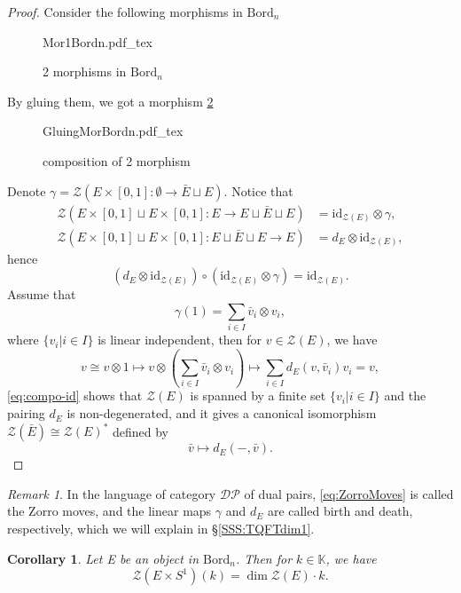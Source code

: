 \documentclass[10pt,reqno,final]{article}
\newcommand{\incfig}[1]{%
    \def\svgscale{0.38}
    {#1.pdf_tex}
}
\numberwithin{equation}{section}
\numberwithin{figure}{section}
\numberwithin{table}{section}
\theoremstyle{plain}
\newtheorem{corollary}{Corollary}[theorem]
\theoremstyle{definition}
\theoremstyle{remark}
\newtheorem{remark}{Remark}[theorem]
\begin{document}
\begin{proof}
      Consider the following morphisms in \(\mathrm{Bord}_{n}\)
    \begin{figure}[H]
      \centering
      \incfig{Mor1Bordn}
      \caption{2 morphisms in \(\mathrm{Bord}_{n}\)}
      \label{fig:Mor1Bordn}
    \end{figure}
    By gluing them, we got a morphism \ref{fig:GluingMorBordn}
\begin{figure}[H]
  \centering
  \incfig{GluingMorBordn}
  \caption{composition of 2 morphism}
  \label{fig:GluingMorBordn}
\end{figure}
    Denote \(\gamma=\mathcal{Z}(E\times [0,1]:\emptyset\to \bar{E}\sqcup E )\). Notice that 
    \begin{align}
      \mathcal{Z}(E\times [0,1]\sqcup E\times [0,1]:E\to E\sqcup \bar{E}\sqcup E) & =\mathrm{id}_{\mathcal{Z}(E)}\otimes\gamma,\\
      \mathcal{Z}(E\times [0,1]\sqcup E\times [0,1]:E\sqcup \bar{E}\sqcup E\to E) & = d_{E}\otimes \mathrm{id}_{\mathcal{Z}(E)},
    \end{align}
    hence
    \begin{equation}\label{eq:ZorroMoves}
      (d_{E}\otimes \mathrm{id}_{\mathcal{Z}(E)})\circ (\mathrm{id}_{\mathcal{Z}(E)}\otimes\gamma)=\mathrm{id}_{\mathcal{Z}(E)}.
    \end{equation}
    Assume that
    \[
      \gamma(1)=\sum_{i\in I}\bar{v}_i\otimes v_i,
    \]
    where \(\{ v_{i}|i\in I \}\) is linear independent, then for \(v\in \mathcal{Z}(E )\), we have 
    \begin{equation}\label{eq:compo-id}
      v\cong v\otimes 1\mapsto v\otimes\left( \sum_{i\in I}\bar{v}_i\otimes v_i \right)\mapsto \sum_{i\in I}d_{E }(v,\bar{v}_{i})v_i=v, 
    \end{equation}
    \eqref{eq:compo-id} shows that \(\mathcal{Z}(E )\) is spanned by a finite set \(\{ v_{i}|i\in I \}\) and the pairing \(d_{E }\) is non-degenerated, and it gives a canonical isomorphism \(\mathcal{Z}(\bar{E})\cong \mathcal{Z}(E )^{*}\) defined by
    \begin{equation}
      \bar{v}\mapsto d_{E}(-,\bar{v}).
    \end{equation}
    \end{proof}
    
    \begin{remark}
      In the language of category \(\mathcal{DP}\) of dual pairs, \eqref{eq:ZorroMoves} is called the Zorro moves, and the linear maps \(\gamma\) and \(d_{E }\) are called birth and death, respectively, which we will explain in \S \ref{SSS:TQFTdim1}.
    \end{remark}
    \begin{corollary}
      Let E be an object in \(\mathrm{Bord}_{n}\). Then for \(k \in \mathbb{K}\), we have 
      \[
        \mathcal{Z}(E\times S^{1})(k)=\dim \mathcal{Z}(E )\cdot k .
      \]
    \end{corollary}
\end{document}
